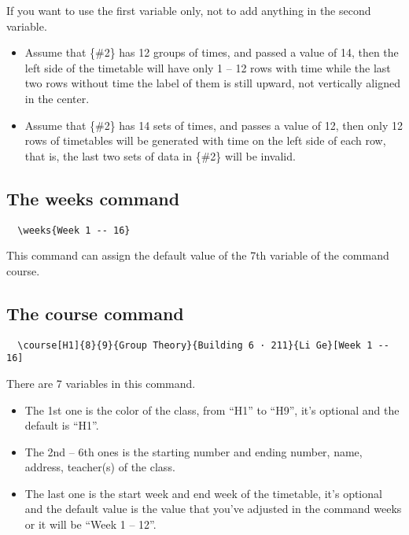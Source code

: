 \documentclass[11pt]{article}
\def\cmd#1{\texorpdfstring{\textcolor{cmdcolor}{\textsf{#1}}}{“#1”}}
\begin{document}
If you want to use the first variable \cmd{\ttfamily[\#1]} only, not to add anything in the second variable.

\begin{itemize}
  \item Assume that \cmd{\ttfamily\{\#2\}} has 12 groups of times, and \cmd{\ttfamily[\#1]} passed a value of 14, then the left side of the timetable will have only 1 -- 12 rows with time while the last two rows without time the label of them is still upward, not vertically aligned in the center.
  \item Assume that \cmd{\ttfamily\{\#2\}} has 14 sets of times, and \cmd{\ttfamily[\#1]} passes a value of 12, then only 12 rows of timetables will be generated with time on the left side of each row, that is, the last two sets of data in \cmd{\ttfamily\{\#2\}} will be invalid.
\end{itemize}

\subsection{The \cmd{weeks} command}
\begin{verbatim}
  \weeks{Week 1 -- 16}
\end{verbatim}

This command can assign the default value of the 7th variable of the command \cmd{course}.

\subsection{The \cmd{course} command}
\begin{verbatim}
  \course[H1]{8}{9}{Group Theory}{Building 6 · 211}{Li Ge}[Week 1 -- 16]
\end{verbatim}

There are 7 variables in this command.
\begin{itemize}
  \item The 1st one is the color of the class, from ``H1'' to ``H9'', it's optional and the default is ``H1''.
  \item The 2nd -- 6th ones is the starting number and ending number, name, address, teacher(s) of the class.
  \item The last one is the start week and end week of the timetable, it's optional and the default value is the value that you've adjusted in the command \cmd{weeks} or it will be ``Week 1 -- 12''.
\end{itemize}
\end{document}
